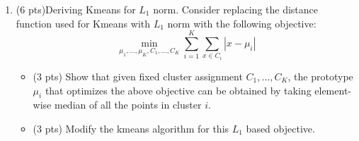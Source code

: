 \documentclass{article}
\begin{document}
\begin{enumerate}
\begin{itemize}
\end{itemize}


\item (6 pts)Deriving Kmeans for $L_1$ norm. 
Consider replacing the distance function used for Kmeans with $L_1$ norm with the following objective:
\[\min_{\mu_1,...,\mu_K,C_1,...,C_K}\sum_{i=1}^K \sum_{x\in C_i} |x-\mu_i|\]

\begin{itemize}
    \item (3 pts) Show that given fixed cluster assignment $C_1, ..., C_K$, the prototype $\mu_i$ that optimizes the above objective can be obtained by taking element-wise median of all the points in cluster $i$.


\item  (3 pts) Modify the kmeans algorithm for this $L_1$ based objective.\\
\end{itemize}
\end{enumerate}
\end{document}
